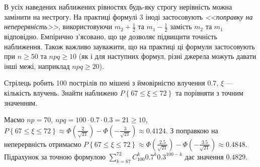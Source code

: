 \begin{remark}
    В усіх наведених наближених рівностях будь-яку строгу нерівність можна замінити на нестрогу. На практиці формулі 3 іноді застосовують \emph{<<поправку на неперервність>>},
    використовуючи $m_2 + \frac{1}{2}$ та $m_1 - \frac{1}{2}$ замість $m_2$ та $m_1$ відповідно. Емпірично з'ясовано, що це дозволяє підвищити точність наближення.
    Також важливо зауважити, що на практиці ці формули застосовують при $n \geq 50$ та $npq \geq 10$ (як і для наступних формул, 
    різні джерела можуть давати інші межі, наприклад $npq \geq 20$).
\end{remark}
\begin{example}
    Стрілець робить 100 пострілів по мішені з ймовірністю влучення $0.7$, $\xi$ --- кількість влучень. Знайти наближено 
    $P\left\{ 67 \leq \xi \leq 72\right\}$ та порівняти з точним значенням.
    
    \noindent Маємо $np = 70$, $npq = 100 \cdot 0.7 \cdot 0.3 = 21 \geq 10$, $P\left\{ 67 \leq \xi \leq 72\right\} \approx 
    \Phi\left( \frac{2}{\sqrt{21}}\right) - \Phi\left(-\frac{3}{\sqrt{21}}\right) \approx 0.4124$.
    З поправкою на неперервність отримаємо 
    $P\left\{ 67 \leq \xi \leq 72\right\} \approx 
    \Phi\left( \frac{2.5}{\sqrt{21}}\right) - \Phi\left(-\frac{3.5}{\sqrt{21}}\right) \approx 0.4848$.
    Підрахунок за точною формулою $\sum\limits_{k=67}^{72} C_{100}^{k} 0.7^k 0.3^{100-k}$ дає значення $0.4829$.
\end{example}

